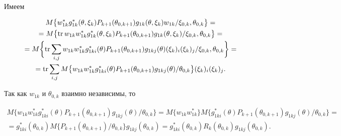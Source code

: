 \begin{pf} Имеем


\begin{gather*}


M\bigl\{w_{1k}^{*}g_{1k}^{*}(\theta,\xi_{k})P_{k+1}(\theta_{0,k+1})


g_{1k}(\theta,\xi_{k})w_{1k}/\xi_{0,k},\theta_{0,k}\bigr\}=\\


%


=M\bigl\{ \tr w_{1k}w_{1k}^{*}g_{1k}^{*}(\theta,\xi_{k})


P_{k+1}(\theta_{0,k+1})g_{1k}(\theta,\xi_{k})


/\xi_{0,k},\theta_{0,k}\bigr\}=\\


%


=M\biggl\{\tr \sum_{i,j}w_{1k}w_{1k}^{*}g_{1ki}^{*}(\theta)


P_{k+1}(\theta_{0,k+1})g_{1kj}(\theta)(\xi_{k})_{i}(\xi_{k})_{j}/


\xi_{0,k},\theta_{0,k}\biggr\}=\\


%


=\tr \sum_{i,j}M\bigl\{w_{1k}w_{1k}^{*}g_{1ki}^{*}(\theta)


P_{k+1}(\theta_{0,k+1})g_{1kj}(\theta)/


\theta_{0,k}\bigr\}(\xi_{k})_{i}(\xi_{k})_{j}.


\end{gather*}


Так как $w_{1k}$ и $\theta_{0,k}$ взаимно независимы, то


\begin{gather*}


M\bigl\{w_{1k}w_{1k}^{*}g_{1ki}^{*}(\theta)


P_{k+1}(\theta_{0,k+1})g_{1kj}(\theta)/


\theta_{0,k}\bigr\}=


M\bigl\{w_{1k}w_{1k}^{*}\bigr\}


M\bigl\{g_{1ki}^{*}(\theta)


P_{k+1}(\theta_{0,k+1})g_{1kj}(\theta)/


\theta_{0,k}\bigr\}=\\


%


=g_{1ki}^{*}(\theta_{0,k})M\bigl\{P_{k+1}(\theta_{0,k+1})/


\theta_{0,k}\bigr\}g_{1kj}(\theta_{0,k})=


g_{1ki}^{*}(\theta_{0,k})R_{k}(\theta_{0,k})g_{1kj}(\theta_{0,k}).



\end{gather*}
\end{pf}
